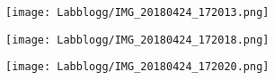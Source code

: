\begin{figure}[H]
    \centering
    \texttt{[image: Labblogg/IMG\_20180424\_172013.png]}
    \caption*{}
    \label{fig:my_label}
\end{figure}

\begin{figure}[H]
    \centering
    \texttt{[image: Labblogg/IMG\_20180424\_172018.png]}
    \caption*{}
    \label{fig:my_label}
\end{figure}

\begin{figure}[H]
    \centering
    \texttt{[image: Labblogg/IMG\_20180424\_172020.png]}
    \caption*{}
    \label{fig:my_label}
\end{figure}
